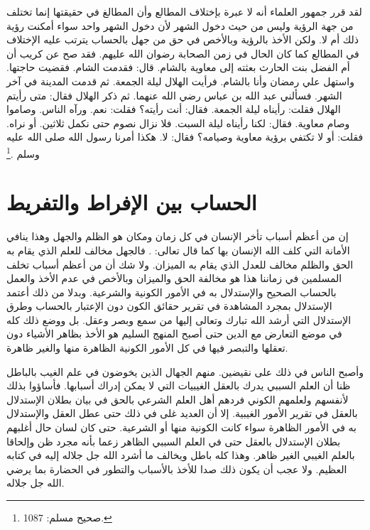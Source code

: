 لقد قرر جمهور العلماء أنه لا عبرة بإختلاف المطالع وأن المطالغ في حقيقتها إنما تختلف من جهة الرؤية وليس من حيث دخول الشهر لأن دخول الشهر واحد سواء أمكنت رؤية ذلك أم لا. ولكن الأخذ بالرؤية وبالأخص في حق من جهل بالحساب يترتب عليه الإختلاف في المطالع كما كان الحال في زمن الصحابة رضوان الله عليهم. فقد صح عن كريب أن أم الفضل بنت الحارث بعثته إلى معاوية بالشام. قال: فقدمت الشام. فقضيت حاجتها. واستهل علي رمضان وأنا بالشام. فرأيت الهلال ليلة الجمعة. ثم قدمت المدينة في آخر الشهر. فسألني عبد الله بن عباس رضي الله عنهما. ثم ذكر الهلال فقال: متى رأيتم الهلال فقلت: رأيناه ليلة الجمعة. فقال: أنت رأيته؟ فقلت: نعم. ورآه الناس. وصاموا وصام معاوية. فقال: لكنا رأيناه ليلة السبت. فلا نزال نصوم حتى نكمل ثلاثين. أو نراه. فقلت: أو لا تكتفي برؤية معاوية وصيامه؟ فقال: لا. هكذا أمرنا رسول الله صلى الله عليه وسلم \href{https://shamela.ws/book/1727/2460#p3}{\faExternalLink} \cite{muslim}.\footnote{صحيح مسلم: 1087.} 


\section{الحساب بين الإفراط والتفريط}

إن من أعظم أسباب تأخر الإنسان في كل زمان ومكان هو الظلم والجهل وهذا ينافي الأمانة التي كلف الله الإنسان بها كما قال تعالى: \quranayah*[33][72] {\footnotesize (\surahname*[33])}. فالجهل مخالف للعلم الذي يقام به الحق والظلم مخالف للعدل الذي يقام به الميزان. ولا شك أن من أعظم أسباب تخلف المسلمين في زماننا هذا هو مخالفة الحق والميزان وبالأخص في عدم الأخذ والعمل بالحساب الصحيح والإستدلال به في الأمور الكونية والشرعية. وبدلا من ذلك أعتمد الإستدلال بمجرد المشاهدة في تقرير حقائق الكون دون الإعتبار بالحساب وطرق الإستدلال التي أرشد الله تبارك وتعالى إليها من سمع وبصر وعقل. بل ووضع ذلك كله في موضع التعارض مع الدين حتى أصبح المنهج السليم هو الأخذ بظاهر الأشياء دون تعقلها والتبصر فيها في كل الأمور الكونية الظاهرة منها والغير ظاهرة.  

وأصبح الناس في ذلك على نقيضين. منهم الجهال الذين يخوضون في علم الغيب بالباطل ظنا أن العلم السببي يدرك بالعقل الغيبيات التي لا يمكن إدراك أسبابها. فأساؤوا بذلك لأنفسهم ولعلمهم الكوني فردهم أهل العلم الشرعي بالحق في بيان بطلان الإستدلال بالعقل في تقرير الأمور الغيبية. إلا أن العديد غلى في ذلك حتى عطل العقل والإستدلال به في الأمور الظاهرة سواء كانت الكونية منها أو الشرعية. حتى كان لسان حال أغلبهم بطلان الإستدلال بالعقل حتى في العلم السببي الظاهر زعما بأنه مجرد ظن وإلحاقا بالعلم الغيبي الغير ظاهر. وهذا كله باطل ويخالف ما أشرد الله جل جلاله إليه في كتابه العظيم. ولا عجب أن يكون ذلك صدا للأخذ بالأسباب والتطور في الحضارة بما يرضي الله جل جلاله. 

